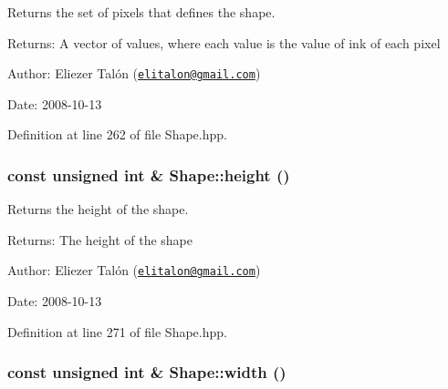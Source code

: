 Returns the set of pixels that defines the shape. 

\begin{Desc}
\item[Returns:]A vector of values, where each value is the value of ink of each pixel\end{Desc}
\begin{Desc}
\item[Author:]Eliezer Talón (\href{mailto:elitalon@gmail.com}{\tt elitalon@gmail.com}) \end{Desc}
\begin{Desc}
\item[Date:]2008-10-13 \end{Desc}


Definition at line 262 of file Shape.hpp.\hypertarget{class_shape_7a417d1fc74acae89f4d96ac36e0b73e}{
\subsubsection[height]{\setlength{\rightskip}{0pt plus 5cm}const unsigned int \& Shape::height ()}}
\label{class_shape_7a417d1fc74acae89f4d96ac36e0b73e}


Returns the height of the shape. 

\begin{Desc}
\item[Returns:]The height of the shape\end{Desc}
\begin{Desc}
\item[Author:]Eliezer Talón (\href{mailto:elitalon@gmail.com}{\tt elitalon@gmail.com}) \end{Desc}
\begin{Desc}
\item[Date:]2008-10-13 \end{Desc}


Definition at line 271 of file Shape.hpp.\hypertarget{class_shape_aa9328cb87de52f53496b6a1eb3a60b9}{
\subsubsection[width]{\setlength{\rightskip}{0pt plus 5cm}const unsigned int \& Shape::width ()}}
\label{class_shape_aa9328cb87de52f53496b6a1eb3a60b9}


